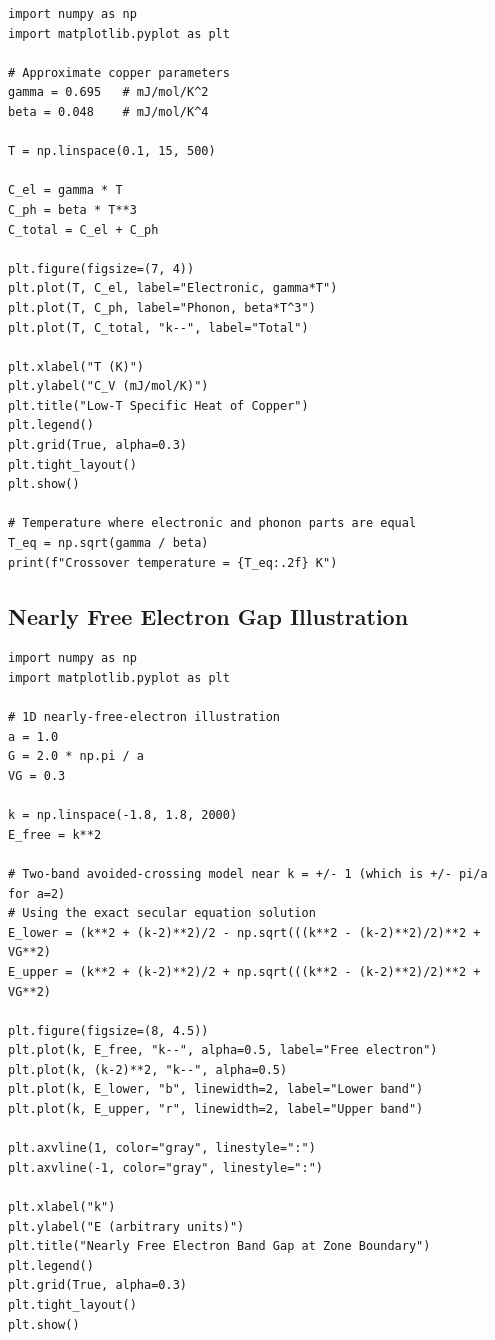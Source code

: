 \documentclass[11pt,a4paper]{article}
\begin{document}
\begin{lstlisting}
import numpy as np
import matplotlib.pyplot as plt

# Approximate copper parameters
gamma = 0.695   # mJ/mol/K^2
beta = 0.048    # mJ/mol/K^4

T = np.linspace(0.1, 15, 500)

C_el = gamma * T
C_ph = beta * T**3
C_total = C_el + C_ph

plt.figure(figsize=(7, 4))
plt.plot(T, C_el, label="Electronic, gamma*T")
plt.plot(T, C_ph, label="Phonon, beta*T^3")
plt.plot(T, C_total, "k--", label="Total")

plt.xlabel("T (K)")
plt.ylabel("C_V (mJ/mol/K)")
plt.title("Low-T Specific Heat of Copper")
plt.legend()
plt.grid(True, alpha=0.3)
plt.tight_layout()
plt.show()

# Temperature where electronic and phonon parts are equal
T_eq = np.sqrt(gamma / beta)
print(f"Crossover temperature = {T_eq:.2f} K")
\end{lstlisting}

\subsection{Nearly Free Electron Gap Illustration}

\begin{lstlisting}
import numpy as np
import matplotlib.pyplot as plt

# 1D nearly-free-electron illustration
a = 1.0
G = 2.0 * np.pi / a
VG = 0.3

k = np.linspace(-1.8, 1.8, 2000)
E_free = k**2

# Two-band avoided-crossing model near k = +/- 1 (which is +/- pi/a for a=2)
# Using the exact secular equation solution
E_lower = (k**2 + (k-2)**2)/2 - np.sqrt(((k**2 - (k-2)**2)/2)**2 + VG**2)
E_upper = (k**2 + (k-2)**2)/2 + np.sqrt(((k**2 - (k-2)**2)/2)**2 + VG**2)

plt.figure(figsize=(8, 4.5))
plt.plot(k, E_free, "k--", alpha=0.5, label="Free electron")
plt.plot(k, (k-2)**2, "k--", alpha=0.5)
plt.plot(k, E_lower, "b", linewidth=2, label="Lower band")
plt.plot(k, E_upper, "r", linewidth=2, label="Upper band")

plt.axvline(1, color="gray", linestyle=":")
plt.axvline(-1, color="gray", linestyle=":")

plt.xlabel("k")
plt.ylabel("E (arbitrary units)")
plt.title("Nearly Free Electron Band Gap at Zone Boundary")
plt.legend()
plt.grid(True, alpha=0.3)
plt.tight_layout()
plt.show()
\end{lstlisting}
\end{document}
